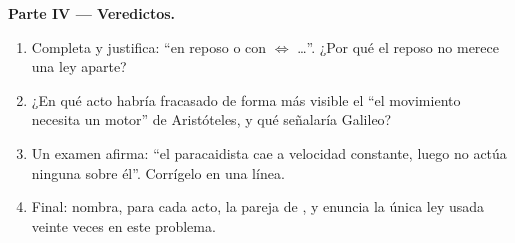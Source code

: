 \begin{problem}
\medskip
\noindent\textbf{Parte IV --- Veredictos.}
\begin{enumerate}[resume]
  \item Completa y justifica: ``en reposo o con  $\iff$ \dots''. ¿Por qué el reposo no merece una ley
        aparte?
  \item ¿En qué acto habría fracasado de forma más visible el
        ``el movimiento necesita un motor'' de Aristóteles, y qué
        señalaría Galileo?
  \item Un examen afirma: ``el paracaidista cae a velocidad constante,
        luego no actúa ninguna  sobre él''. Corrígelo en una
        línea.
  \item Final: nombra, para cada acto, la pareja de , y enuncia la única ley usada veinte veces en este
        problema.
\end{enumerate}
\end{problem}
